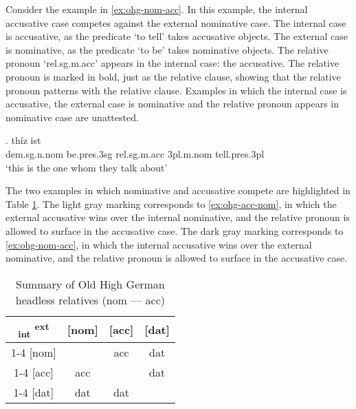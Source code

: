 Consider the example in \ref{ex:ohg-nom-acc}. In this example, the internal accusative case competes against the external nominative case.
The internal case is accusative, as the predicate  `to tell' takes accusative objects.
The external case is nominative, as the predicate  `to be' takes nominative objects.
The relative pronoun  `\ac{rel}.\ac{sg}.\ac{m}.\ac{acc}' appears in the internal case: the accusative. The relative pronoun is marked in bold, just as the relative clause, showing that the relative pronoun patterns with the relative clause.
Examples in which the internal case is accusative, the external case is nominative and the relative pronoun appears in nominative case are unattested.

\exg. thíz ist   \\
\ac{dem}.\ac{sg}.\ac{n}.\ac{nom} be.\ac{pres}.3\ac{sg}\scsub{[nom]} \ac{rel}.\ac{sg}.\ac{m}.\ac{acc} 3\ac{pl}.\ac{m}.\ac{nom} tell.\ac{pres}.3\ac{pl}\scsub{[acc]}\\
`this is the one whom they talk about' \label{ex:ohg-nom-acc}

The two examples in which nominative and accusative compete are highlighted in Table \ref{tbl:summary-old-high-german-nom-acc}. The light gray marking corresponds to \ref{ex:ohg-acc-nom}, in which the external accusative wins over the internal nominative, and the relative pronoun is allowed to surface in the accusative case. The dark gray marking corresponds to \ref{ex:ohg-nom-acc}, in which the internal accusative wins over the external nominative, and the relative pronoun is allowed to surface in the accusative case.

\begin{table}[H]
  \center
  \caption{Summary of Old High German headless relatives (\ac{nom} --- \ac{acc})}
  \begin{tabular}{c|c|c|c}
    \toprule
        \textsubscript{\ac{int}} \textsuperscript{\ac{ext}}
          & [\ac{nom}]
          & [\ac{acc}]
          & [\ac{dat}]
          \\ \cmidrule{1-4}
      [\ac{nom}]
          & \xcancel{\phantom{xx}}
          & \cellcolor{LG}\ac{acc}
          & \ac{dat}
          \\ \cmidrule{1-4}
      [\ac{acc}]
          & \cellcolor{DG}\ac{acc}
          & \xcancel{\phantom{xx}}
          & \ac{dat}
          \\ \cmidrule{1-4}
      [\ac{dat}]
          & \ac{dat}
          & \ac{dat}
          & \xcancel{\phantom{xx}}
          \\
    \bottomrule
  \end{tabular}
    \label{tbl:summary-old-high-german-nom-acc}
\end{table}

